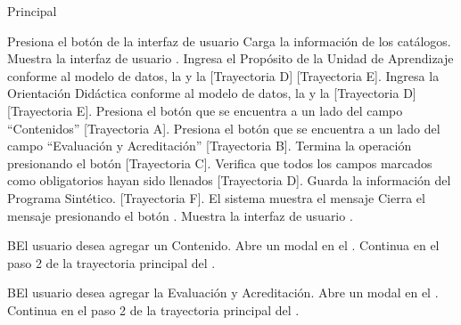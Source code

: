 \begin{UCtrayectoria}{Principal}

\UCpaso[\UCactor] Presiona el botón  de la interfaz de usuario 
\UCpaso Carga la información de los catálogos.
\UCpaso Muestra la interfaz de usuario .
\UCpaso[\UCactor] Ingresa el Propósito de la Unidad de Aprendizaje conforme al modelo de datos, la  y la  [Trayectoria D] [Trayectoria E]. 
\UCpaso[\UCactor] Ingresa la Orientación Didáctica conforme al modelo de datos, la  y la  [Trayectoria D] [Trayectoria E].
\UCpaso[\UCactor] Presiona el botón   \BtnModal que se encuentra a un lado del campo ``Contenidos'' [Trayectoria A].
\UCpaso[\UCactor] Presiona el botón \BtnModal que se encuentra a un lado del campo ``Evaluación y Acreditación'' [Trayectoria B].
\UCpaso[\UCactor] Termina la operación presionando el botón  [Trayectoria C].
\UCpaso Verifica que todos los campos marcados como obligatorios hayan sido llenados [Trayectoria D].
\UCpaso Guarda la información del Programa Sintético. [Trayectoria F].
\UCpaso El sistema muestra el mensaje 
\UCpaso[\UCactor] Cierra el mensaje presionando el botón . 
\UCpaso Muestra la interfaz de usuario .
\end{UCtrayectoria}


\begin{UCtrayectoriaA}{B}{El usuario desea agregar un Contenido.}
\UCpaso Abre un modal en el .
\UCpaso Continua en el paso 2 de la trayectoria principal del .
\end{UCtrayectoriaA}

\begin{UCtrayectoriaA}{B}{El usuario desea agregar la Evaluación y Acreditación.}
\UCpaso Abre un modal en el .
\UCpaso Continua en el paso 2 de la trayectoria principal del .
\end{UCtrayectoriaA}

